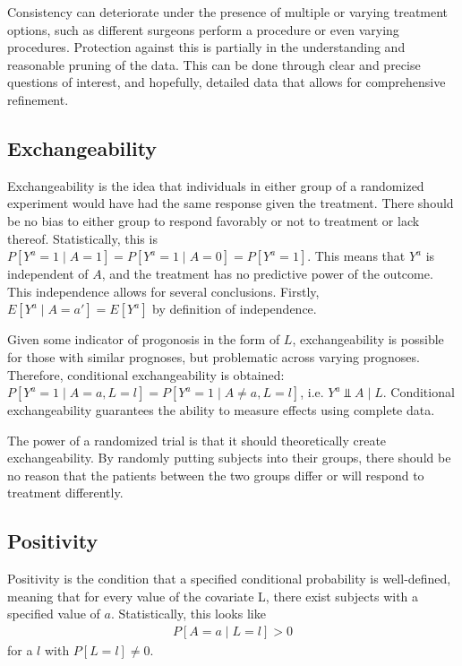 Consistency can deteriorate under the presence of multiple or varying treatment options, such as different surgeons perform a procedure or even varying procedures.  Protection against this is partially in the understanding and reasonable pruning of the data.  This can be done through clear and precise questions of interest, and hopefully, detailed data that allows for comprehensive refinement.  

\subsection{Exchangeability} \label{exchangeability} 
Exchangeability is the idea that individuals in either group of a randomized experiment would have had the same response given the treatment. \cite{hernan_robins_2016}There should be no bias to either group to respond favorably or not to treatment or lack thereof.  
Statistically, this is $P[Y^a = 1 \mid A = 1] = P[Y^a = 1 \mid A = 0] = P[Y^a = 1]$.  This means that $Y^a$ is independent of $A$, and the treatment has no predictive power of the outcome.  This independence allows for several conclusions.  Firstly, $E[Y^a \mid A = a'] = E[Y^a]$ by definition of independence.  

Given some indicator of progonosis in the form of $L$, exchangeability is possible for those with similar prognoses, but problematic across varying prognoses.  Therefore, conditional exchangeability is obtained: $P[Y^a = 1 \mid A = a, L=l] = P[Y^a = 1 \mid A \neq a, L=l]$, i.e. $Y^{a} \Perp A\mid L$. \cite{hernan_robins_2016}  Conditional exchangeability guarantees the ability to measure effects using complete data.  

The power of a randomized trial is that it should theoretically create exchangeability.  By randomly putting subjects into their groups, there should be no reason that the patients between the two groups differ or will respond to treatment differently.  
      
\subsection{Positivity} 
Positivity is the condition that a specified conditional probability is well-defined, meaning that for every value of the covariate L, there exist subjects with a specified value of $a$.\cite{hernan2006estimating}  Statistically, this looks like 
\begin{align}
P[A=a \mid L=l] > 0 
\end{align} 
for a $l$ with $P[L=l] \neq 0$. 



